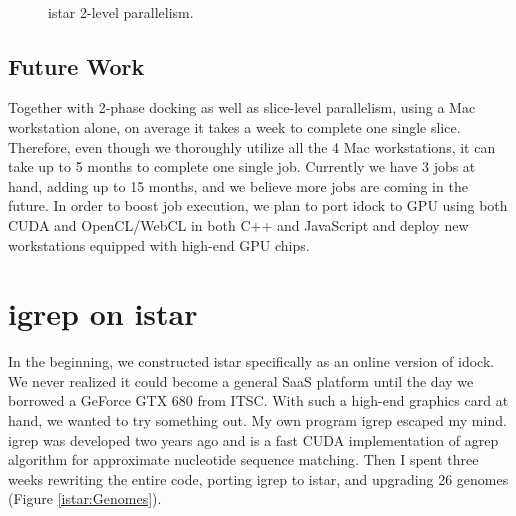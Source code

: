 \begin{figure}
\centering
{}
\\
\caption{istar 2-level parallelism.}
\label{istar:2LevelParallelism}
\end{figure}

\subsection{Future Work}

Together with 2-phase docking as well as slice-level parallelism, using a Mac workstation alone, on average it takes a week to complete one single slice. Therefore, even though we thoroughly utilize all the 4 Mac workstations, it can take up to 5 months to complete one single job. Currently we have 3 jobs at hand, adding up to 15 months, and we believe more jobs are coming in the future. In order to boost job execution, we plan to port idock to GPU using both CUDA and OpenCL/WebCL in both C++ and JavaScript and deploy new workstations equipped with high-end GPU chips.

\section{igrep on istar}

In the beginning, we constructed istar specifically as an online version of idock. We never realized it could become a general SaaS platform until the day we borrowed a GeForce GTX 680 from ITSC. With such a high-end graphics card at hand, we wanted to try something out. My own program igrep \citep{1138} escaped my mind. igrep was developed two years ago and is a fast CUDA implementation of agrep algorithm for approximate nucleotide sequence matching. Then I spent three weeks rewriting the entire code, porting igrep to istar, and upgrading 26 genomes (Figure \ref{istar:Genomes}).

